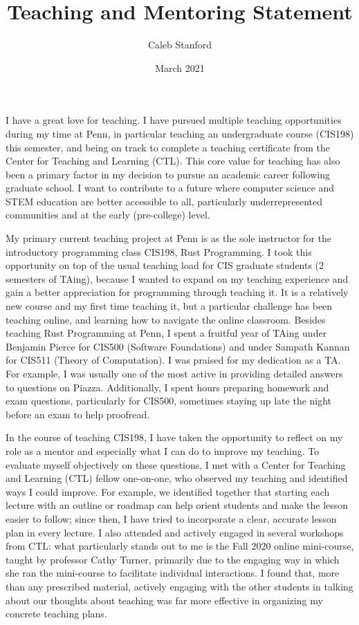 \documentclass{article}
\title{Teaching and Mentoring Statement}
\author{Caleb Stanford}
\date{March 2021}
\begin{document}
\maketitle{}

I have a great love for teaching.
I have pursued multiple teaching opportunities during my time at Penn, in particular teaching an undergraduate course (CIS198) this semester,
and being on track to complete a teaching certificate from the Center for Teaching and Learning (CTL).
This core value for teaching has also been a primary factor in my decision to pursue an academic career following graduate school.
I want to contribute to a future where computer science and STEM education are better accessible to all, particularly underrepresented communities and at the early (pre-college) level.

My primary current teaching project at Penn is as the sole instructor for the introductory programming class CIS198, Rust Programming.
I took this opportunity on top of the usual teaching load for CIS graduate students (2 semesters of TAing),
because I wanted to expand on my teaching experience and gain a better
appreciation for programming through teaching it.
It is a relatively new course and my first time teaching it, but a particular challenge has been teaching online, and learning how to navigate the online classroom.
Besides teaching Rust Programming at Penn, I spent a fruitful year of TAing under Benjamin Pierce for CIS500 (Software Foundations) and under Sampath Kannan for CIS511 (Theory of Computation). I was praised for my dedication as a TA. For example, I was usually one of the most active in providing detailed answers to questions on Piazza. Additionally, I spent hours preparing homework and exam questions, particularly for CIS500, sometimes staying up late the night before an exam to help proofread.

In the course of teaching CIS198, I have taken the opportunity to reflect on my role as a mentor
and especially what I can do to improve my teaching.
To evaluate myself objectively on these questions, I met with a Center for Teaching and Learning (CTL) fellow one-on-one, who observed my teaching and identified ways I could improve.
For example, we identified together that starting each lecture with an outline or
roadmap can help orient students and make the lesson easier to follow; since then, I have tried to incorporate a clear, accurate lesson plan in every lecture.
I also attended and actively engaged in several workshops from CTL: what particularly stands out to me is the
Fall 2020 online mini-course, taught by professor Cathy Turner, primarily due to the engaging way in which she ran the mini-course to facilitate individual interactions. I found that, more than any prescribed material, actively engaging with the other students in talking about our thoughts about teaching was far more effective in organizing my concrete teaching plans.
\end{document}
